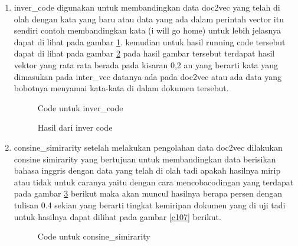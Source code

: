 \begin{enumerate}
\item inver\_code digunakan untuk membandingkan data doc2vec yang telah di olah dengan kata yang baru atau data yang ada dalam perintah vector itu sendiri contoh membandingkan kata (i will go home) untuk lebih jelasnya dapat di lihat pada gambar \ref{c104}. kemudian untuk hasil running code tersebut dapat di lihat pada gambar \ref{c105} pada hasil gambar tersebut terdapat hasil vektor yang rata rata berada pada kisaran 0,2 an yang berarti kata yang dimasukan pada inter\_vec datanya ada pada doc2vec atau ada data yang bobotnya menyamai kata-kata di dalam dokumen tersebut.

\begin{figure}[!htbp]
      \caption{Code untuk inver\_code}
      \label{c104}
      \end{figure}

\begin{figure}[!htbp]
      \caption{Hasil dari inver code}
      \label{c105}
      \end{figure}

\item consine\_simirarity setelah melakukan pengolahan data doc2vec dilakukan consine simirarity yang bertujuan untuk membandingkan data berisikan bahasa inggris dengan data yang telah di olah tadi apakah hasilnya mirip atau tidak untuk caranya yaitu dengan cara mencobacodingan yang terdapat pada gambar \ref{c106} berikut maka akan muncul hasilnya berapa persen dengan tulisan 0.4 sekian yang berarti tingkat kemiripan dokumen yang di uji tadi untuk hasilnya dapat dilihat pada gambar \ref{c107} berikut.

\begin{figure}[!htbp]
      \caption{Code untuk consine\_simirarity}
      \label{c106}
      \end{figure}


\end{enumerate}
